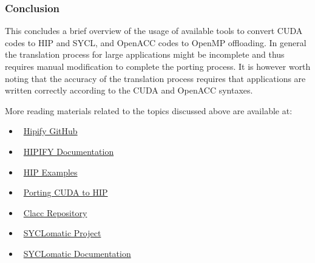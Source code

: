 \subsubsection{Conclusion}


\par
This concludes a brief overview of the usage of available tools to convert CUDA codes to HIP and SYCL, and OpenACC codes to OpenMP offloading.
In general the translation process for large applications might be incomplete and thus requires manual modification to complete the porting process.
It is however worth noting that the accuracy of the translation process requires that applications are written correctly according to the CUDA and OpenACC syntaxes.


\par
More reading materials related to the topics discussed above are available at:
\begin{itemize}
    \item~\href{https://github.com/ROCm-Developer-Tools/HIPIFY}{Hipify GitHub}
    \item~\href{https://rocm.docs.amd.com/projects/HIPIFY/en/latest/index.html}{HIPIFY Documentation}
    \item~\href{https://github.com/olcf-tutorials/simple_HIP_examples/tree/master/vector_addition}{HIP Examples}
    \item~\href{https://www.admin-magazine.com/HPC/Articles/Porting-CUDA-to-HIP}{Porting CUDA to HIP}
    \item~\href{https://github.com/llvm-doe-org/llvm-project/blob/clacc/main/README.md}{Clacc Repository}
    \item~\href{https://www.intel.com/content/www/us/en/developer/articles/technical/syclomatic-new-cuda-to-sycl-code-migration-tool.html}{SYCLomatic Project}
    \item~\href{https://oneapi-src.github.io/SYCLomatic/get_started/index.html}{SYCLomatic Documentation}
\end{itemize}
